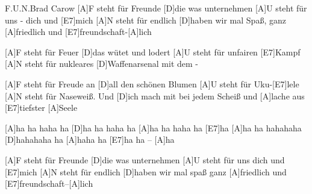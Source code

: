 \documentclass[../main.tex]{subfiles}
\begin{document}
\begin{song}[5]{F.U.N.}{Brad Carow}{}
[A]F steht für Freunde  [D]die was unternehmen
[A]U steht für uns - dich und  [E7]mich
[A]N steht für endlich  [D]haben wir mal Spaß, ganz
[A]friedlich und  [E7]freundschaft-[A]lich

[A]F steht für Feuer [D]das wütet und lodert
[A]U steht für unfairen [E7]Kampf
[A]N steht für nukleares [D]Waffenarsenal mit dem -


[A]F steht für Freude an  [D]all den schönen Blumen
[A]U steht für Uku-[E7]lele
[A]N steht für Naseweiß. Und [D]ich mach mit bei jedem Scheiß und
[A]lache aus  [E7]tiefster  [A]Seele

[A]ha ha haha ha  [D]ha ha haha ha
[A]ha ha haha ha  [E7]ha
[A]ha ha hahahaha  [D]hahahaha ha
[A]haha ha  [E7]ha ha -- [A]ha

[A]F steht für Freunde  [D]die was unternehmen
[A]U steht für uns dich und  [E7]mich
[A]N steht für endlich  [D]haben wir mal spaß ganz
[A]friedlich und  [E7]freundschaft--[A]lich
\end{song}
\end{document}
